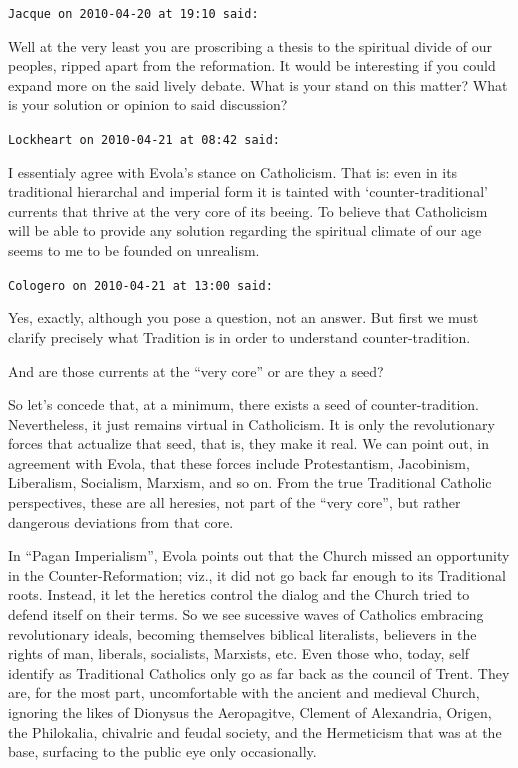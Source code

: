 \begin{footnotesize}
\begin{sffamily}
\texttt{Jacque on 2010-04-20 at 19:10 said:}

Well at the very least you are proscribing a thesis to the spiritual divide of our peoples, ripped apart from the reformation. It would be interesting if you could expand more on the said lively debate. What is your stand on this matter? What is your solution or opinion to said discussion?

\hfill

\texttt{Lockheart on 2010-04-21 at 08:42 said:}

I essentialy agree with Evola's stance on Catholicism. That is: even in its traditional hierarchal and imperial form it is tainted with `counter-traditional' currents that thrive at the very core of its beeing. To believe that Catholicism will be able to provide any solution regarding the spiritual climate of our age seems to me to be founded on unrealism.

\hfill

\texttt{Cologero on 2010-04-21 at 13:00 said:}

Yes, exactly, although you pose a question, not an answer. But first we must clarify precisely what Tradition is in order to understand counter-tradition.

And are those currents at the ``very core'' or are they a seed?

So let's concede that, at a minimum, there exists a seed of counter-tradition. Nevertheless, it just remains virtual in Catholicism. It is only the revolutionary forces that actualize that seed, that is, they make it real. We can point out, in agreement with Evola, that these forces include Protestantism, Jacobinism, Liberalism, Socialism, Marxism, and so on. From the true Traditional Catholic perspectives, these are all heresies, not part of the ``very core'', but rather dangerous deviations from that core.

In ``Pagan Imperialism'', Evola points out that the Church missed an opportunity in the Counter-Reformation; viz., it did not go back far enough to its Traditional roots. Instead, it let the heretics control the dialog and the Church tried to defend itself on their terms. So we see sucessive waves of Catholics embracing revolutionary ideals, becoming themselves biblical literalists, believers in the rights of man, liberals, socialists, Marxists, etc. Even those who, today, self identify as Traditional Catholics only go as far back as the council of Trent. They are, for the most part, uncomfortable with the ancient and medieval Church, ignoring the likes of Dionysus the Aeropagitve, Clement of Alexandria, Origen, the Philokalia, chivalric and feudal society, and the Hermeticism that was at the base, surfacing to the public eye only occasionally.


\end{sffamily}
\end{footnotesize}
